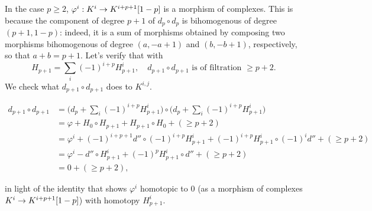 \documentclass[deligne.tex]{subfiles}
\begin{document}
In the case $p\geq2$, $\varphi^i:K^i\rightarrow K^{i+p+1}[1-p]$ is a morphism of
complexes. This is because the component of degree $p+1$ of $d_p\circ d_p$
is bihomogenous of degree $(p+1,1-p)$: indeed, it is a sum of morphisms
obtained by composing two morphisms bihomogenous of degree $(a,-a+1)$ and
$(b,-b+1)$, respectively, so that $a+b=p+1$. Let's verify that with
\begin{equation*}
	H_{p+1}=\sum_i(-1)^{i+p}H^i_{p+1},\quad
	d_{p+1}\circ d_{p+1}\,\,\text{is of filtration $\geq p+2$.}
\end{equation*}
We check what $d_{p+1}\circ d_{p+1}$ does to $K^{i,j}$.
\begin{ceqn}\begin{align*}
	d_{p+1}\circ d_{p+1}
	&=\Big(d_p+\sum_i(-1)^{i+p}H_{p+1}^i\Big)\circ\Big(d_p+\sum_i(-1)^{i+p}H_{p+1}^i\Big) \\
	&=\varphi+H_0\circ H_{p+1}+H_{p+1}\circ H_0+(\geq p+2) \\
	&=\varphi^i+(-1)^{i+p+1}d''\circ (-1)^{i+p}H_{p+1}^i+(-1)^{i+p}H^i_{p+1}\circ (-1)^id''+(\geq p+2) \\
	&=\varphi^i-d''\circ H^i_{p+1}+(-1)^pH_{p+1}^i\circ d''+(\geq p+2) \\
	&=0+(\geq p+2),
\end{align*}\end{ceqn}
in light of the identity that shows $\varphi^i$ homotopic to 0 (as a 
morphism of complexes $K^i\rightarrow K^{i+p+1}[1-p]$) with homotopy $H^i_{p+1}$.
\end{document}
